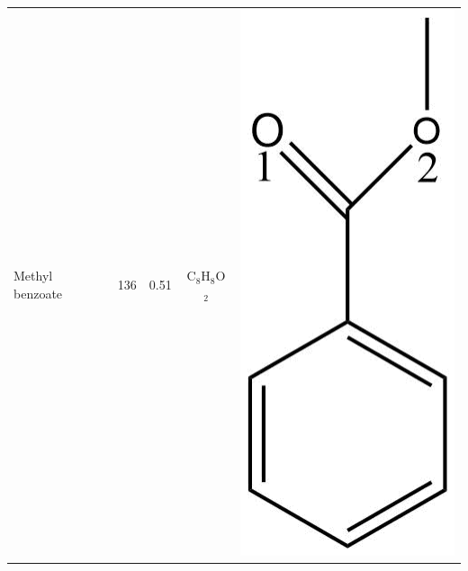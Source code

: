 \begin{table}
\begin{tabular}{lcccc}
\midrule
Methyl benzoate &   136 &0.51&  C$_{8}$H$_{8}$O$_2$ & \begin{minipage}[c]{0.085\linewidth}\centering \includegraphics[width=\linewidth]{pics/cocaine-chapter/MeBz_struct.png}\end{minipage}\\ 

\end{tabular}
\end{table}
